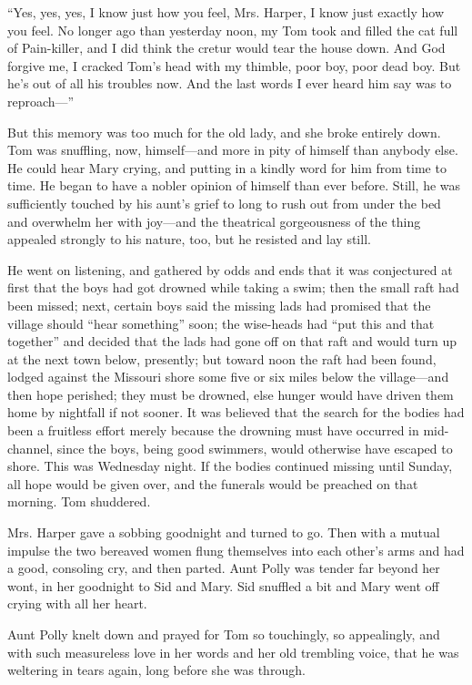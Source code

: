 \documentclass{book}
\begin{document}
“Yes, yes, yes, I know just how you feel, Mrs. Harper, I know just exactly how you feel. No longer ago than yesterday noon, my Tom took and filled the cat full of Pain-killer, and I did think the cretur would tear the house down. And God forgive me, I cracked Tom’s head with my thimble, poor boy, poor dead boy. But he’s out of all his troubles now. And the last words I ever heard him say was to reproach—”

But this memory was too much for the old lady, and she broke entirely down. Tom was snuffling, now, himself—and more in pity of himself than anybody else. He could hear Mary crying, and putting in a kindly word for him from time to time. He began to have a nobler opinion of himself than ever before. Still, he was sufficiently touched by his aunt’s grief to long to rush out from under the bed and overwhelm her with joy—and the theatrical gorgeousness of the thing appealed strongly to his nature, too, but he resisted and lay still.

He went on listening, and gathered by odds and ends that it was conjectured at first that the boys had got drowned while taking a swim; then the small raft had been missed; next, certain boys said the missing lads had promised that the village should “hear something” soon; the wise-heads had “put this and that together” and decided that the lads had gone off on that raft and would turn up at the next town below, presently; but toward noon the raft had been found, lodged against the Missouri shore some five or six miles below the village—and then hope perished; they must be drowned, else hunger would have driven them home by nightfall if not sooner. It was believed that the search for the bodies had been a fruitless effort merely because the drowning must have occurred in mid-channel, since the boys, being good swimmers, would otherwise have escaped to shore. This was Wednesday night. If the bodies continued missing until Sunday, all hope would be given over, and the funerals would be preached on that morning. Tom shuddered.

Mrs. Harper gave a sobbing goodnight and turned to go. Then with a mutual impulse the two bereaved women flung themselves into each other’s arms and had a good, consoling cry, and then parted. Aunt Polly was tender far beyond her wont, in her goodnight to Sid and Mary. Sid snuffled a bit and Mary went off crying with all her heart.

Aunt Polly knelt down and prayed for Tom so touchingly, so appealingly, and with such measureless love in her words and her old trembling voice, that he was weltering in tears again, long before she was through.
\end{document}
